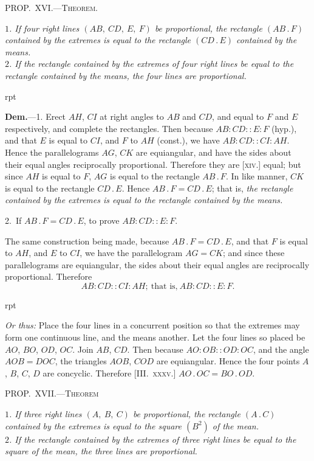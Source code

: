 \documentclass[oneside]{book}
\newcommand\mypropl[2]{
\bigskip\Needspace*{4\baselineskip}\begin{center}\textsc{#1}\end{center}
\hspace{\parindent}\emph{#2}\par\medskip
}
\newcommand\imgflow[3]{
\setcounter{wrapwidth}{#1}
\begin{wrapfigure}[#2]{r}{\value{wrapwidth}pt}
\begin{center}
\vspace{-0.3in}
\end{center}
\end{wrapfigure}
}
\begin{document}
\mypropl{PROP\@.~XVI\@.---Theorem.}{$1$. If four right lines $(AB,\ CD,\ E,\ F)$ be proportional,
the rectangle $(AB\,.\,F)$ contained by the extremes is equal
to the rectangle $(CD\,.\,E)$ contained by the means.\\
\indent $2$. If the rectangle contained by the extremes of four
right lines be equal to the rectangle contained by the
means, the four lines are proportional.}

\imgflow{175}{9}{f187}

\textbf{Dem.}---1. Erect $AH$, $CI$ at right angles to $AB$ and
$CD$, and equal to $F$
and $E$ respectively,
and complete the rectangles.
Then because
$AB : CD :: E : F$
(hyp.), and that $E$ is
equal to $CI$, and $F$ to
$AH$ (const.), we have
$AB : CD:: CI : AH$.
Hence the parallelograms $AG$, $CK$ are equiangular, and
have the sides about their equal angles reciprocally
proportional. Therefore they are [\textsc{xiv.}] equal; but
since $AH$ is equal to $F$, $AG$ is equal to the rectangle
$AB\,.\,F$. In like manner, $CK$ is equal to the rectangle
$CD\,.\,E$. Hence $AB\,.\,F = CD\,.\,E$; that is, \emph{the rectangle
contained by the extremes is equal to the rectangle contained
by the means.}

2.~If $AB\,.\,F = CD\,.\,E$, to prove $AB :CD :: E : F$.

The same construction being made, because $AB\,.\,F
= CD\,.\,E$, and that $F$ is equal to $AH$, and $E$ to $CI$, we
have the parallelogram $AG = CK$; and since these parallelograms
are equiangular, the sides about their equal
angles are reciprocally proportional. Therefore
\[
AB : CD :: CI : AH;\ \text{that is,}\ AB : CD :: E : F.
\]

\imgflow{100}{7}{f188}

\begin{footnotesize}
\emph{Or thus:} Place the four lines in a concurrent
position so that the extremes may
form one continuous line, and the means
another. Let the four lines so placed be
$AO$, $BO$, $OD$, $OC$. Join $AB$, $CD$. Then
because $AO : OB :: OD : OC$, and the
angle $AOB = DOC$, the triangles $AOB$,
$COD$ are equiangular. Hence the four
points $A$, $B$, $C$, $D$ are concyclic. Therefore
[III\@.~\textsc{xxxv.}] $AO\,.\,OC = BO\,.\,OD$.
\par\end{footnotesize}

\mypropl{PROP\@.~XVII\@.---Theorem}{$1$. If three right lines $(A,\ B,\ C)$ be proportional, the
rectangle $(A\,.\,C)$ contained by the extremes is equal to the
square $(B^{2})$ of the mean.\\
\indent $2$. If the rectangle contained by the extremes of three
right lines be equal to the square of the mean, the three
lines are proportional.}
\end{document}
